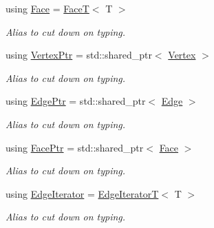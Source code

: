 \begin{DoxyCompactItemize}
using \hyperlink{classDcel_1_1EdgeT_a46456b8f418abc6f09154e8e0d398e37}{Face} = \hyperlink{classDcel_1_1FaceT}{FaceT}$<$ T $>$
\begin{DoxyCompactList}\small\item\em Alias to cut down on typing. \end{DoxyCompactList}\item 
\mbox{\label{classDcel_1_1EdgeT_ab4ba57cfc6b2f90da43096eea87bb284}} 
using \hyperlink{classDcel_1_1EdgeT_ab4ba57cfc6b2f90da43096eea87bb284}{Vertex\+Ptr} = std\+::shared\+\_\+ptr$<$ \hyperlink{classDcel_1_1EdgeT_a2409bc47d421bbea1c091fb6b15da271}{Vertex} $>$
\begin{DoxyCompactList}\small\item\em Alias to cut down on typing. \end{DoxyCompactList}\item 
\mbox{\label{classDcel_1_1EdgeT_af525f4228d820f6b8b23fc02d937e4c8}} 
using \hyperlink{classDcel_1_1EdgeT_af525f4228d820f6b8b23fc02d937e4c8}{Edge\+Ptr} = std\+::shared\+\_\+ptr$<$ \hyperlink{classDcel_1_1EdgeT_a00184663a9d069d2c7a7e0a970f71fd5}{Edge} $>$
\begin{DoxyCompactList}\small\item\em Alias to cut down on typing. \end{DoxyCompactList}\item 
\mbox{\label{classDcel_1_1EdgeT_a97dd9849ea4a21223095f852e48e36e8}} 
using \hyperlink{classDcel_1_1EdgeT_a97dd9849ea4a21223095f852e48e36e8}{Face\+Ptr} = std\+::shared\+\_\+ptr$<$ \hyperlink{classDcel_1_1EdgeT_a46456b8f418abc6f09154e8e0d398e37}{Face} $>$
\begin{DoxyCompactList}\small\item\em Alias to cut down on typing. \end{DoxyCompactList}\item 
\mbox{\label{classDcel_1_1EdgeT_ad55f43bd1061c5ab99c80005861d5bcf}} 
using \hyperlink{classDcel_1_1EdgeT_ad55f43bd1061c5ab99c80005861d5bcf}{Edge\+Iterator} = \hyperlink{classDcel_1_1EdgeIteratorT}{Edge\+IteratorT}$<$ T $>$
\begin{DoxyCompactList}\small\item\em Alias to cut down on typing. \end{DoxyCompactList}\end{DoxyCompactItemize}
